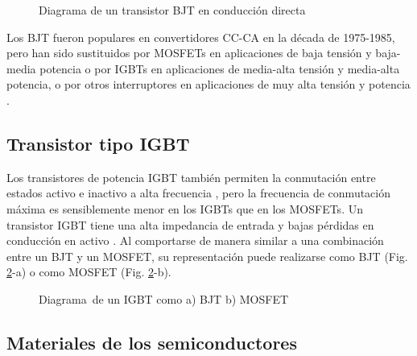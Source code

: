 \documentclass{report}
\begin{document}
\begin{figure}[!h]
    \begin{center}
    \end{center}
    \caption{Diagrama de un transistor BJT en conducción directa \cite{veintiuno}}
    \label{fig.diagrama_bjt}
    \end{figure}

    Los BJT fueron populares en convertidores CC-CA en la década de 1975-1985, pero han sido sustituidos por MOSFETs en aplicaciones de baja tensión y baja-media potencia o por IGBTs en aplicaciones de media-alta tensión y media-alta potencia, o por otros interruptores en aplicaciones de muy alta tensión y potencia \cite{dieciocho}.


\subsection{Transistor tipo IGBT} \label{sec.igbt}

Los transistores de potencia IGBT también permiten la conmutación entre estados activo e inactivo a alta frecuencia \cite{veinte}, pero la frecuencia de conmutación máxima es sensiblemente menor en los IGBTs que en los MOSFETs. Un transistor IGBT tiene una alta impedancia de entrada y bajas pérdidas en conducción en activo \cite{diecinueve}. Al comportarse de manera similar a una combinación entre un BJT y un MOSFET, su representación puede realizarse como BJT (Fig. \ref{fig.igbt}-a) o como MOSFET (Fig. \ref{fig.igbt}-b).

\begin{figure}[!h]
    \begin{center}
    \end{center}
    \caption{Diagrama de un IGBT como a) BJT b) MOSFET}
    \label{fig.igbt}
    \end{figure}

    \subsection{Materiales de los semiconductores} \label{sec.materialessemiconductores}
\end{document}
